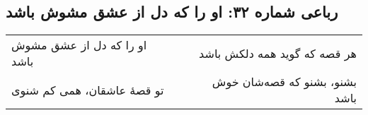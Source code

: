 \begin{center}
\section*{رباعی شماره ۳۲: او را که دل از عشق مشوش باشد}
\label{sec:032}
\begin{longtable}{l p{0.5cm} r}
او را که دل از عشق مشوش باشد
&&
هر قصه که گوید همه دلکش باشد
\\
تو قصهٔ عاشقان، همی کم شنوی
&&
بشنو، بشنو که قصه‌شان خوش باشد
\\
\end{longtable}
\end{center}

